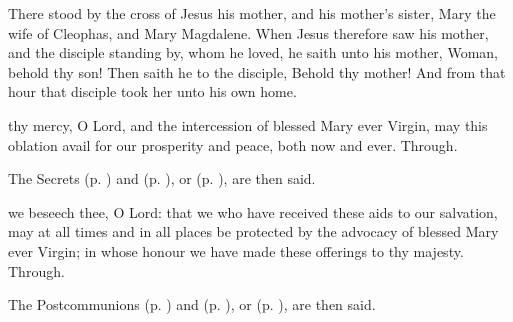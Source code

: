 
 There stood by the cross of Jesus his mother, and his mother's sister, Mary the wife of Cleophas, and Mary Magdalene. When Jesus therefore saw his mother, and the disciple standing by, whom he loved, he saith unto his mother, Woman, behold thy son! Then saith he to the disciple, Behold thy mother! And from that hour that disciple took her unto his own home.


\secret
{} thy mercy, O Lord, and the intercession of blessed Mary ever Virgin, may this oblation avail for our prosperity and peace, both now and ever. Through.
\begin{rubric}
    The Secrets  (p. \pageref{SPHolyGhost}) and  (p. \pageref{SPAgainst}), or  (p. \pageref{SPChiefBishop}), are then said.
\end{rubric}


\postcommunion
{} we beseech thee, O Lord: that we who have received these aids to our salvation, may at all times and in all places be protected by the advocacy of blessed Mary ever Virgin; in whose honour we have made these offerings to thy majesty. Through.
\begin{rubric}
    The Postcommunions  (p. \pageref{SPHolyGhost}) and  (p. \pageref{SPAgainst}), or  (p. \pageref{SPChiefBishop}), are then said.
\end{rubric}


\clearpage
